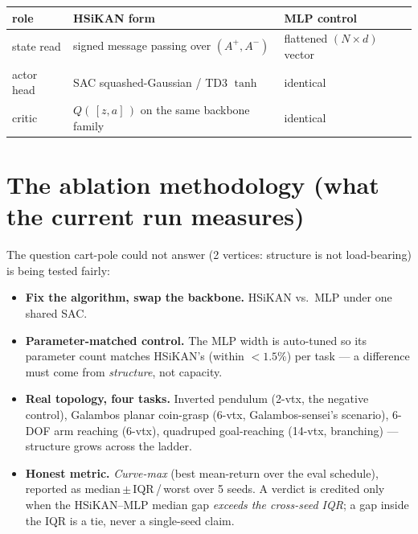 \documentclass[11pt]{article}
\begin{document}
\begin{center}\small
\begin{tabular}{lll}
\toprule
role & HSiKAN form & MLP control \\
\midrule
state read & signed message passing over $(A^+,A^-)$ & flattened $(N{\times}d)$ vector \\
actor head & SAC squashed-Gaussian / TD3 $\tanh$ & identical \\
critic & $Q(\,[z,a]\,)$ on the same backbone family & identical \\
\bottomrule
\end{tabular}
\end{center}

\section{The ablation methodology (what the current run measures)}
The question cart-pole could not answer (2 vertices: structure is not load-bearing) is being tested fairly:
\begin{itemize}[nosep]
  \item \textbf{Fix the algorithm, swap the backbone.} HSiKAN vs.\ MLP under one shared SAC.
  \item \textbf{Parameter-matched control.} The MLP width is auto-tuned so its parameter count matches HSiKAN's
        (within $<1.5\%$) per task --- a difference must come from \emph{structure}, not capacity.
  \item \textbf{Real topology, four tasks.} Inverted pendulum (2-vtx, the negative control), Galambos planar
        coin-grasp (6-vtx, Galambos-sensei's scenario), 6-DOF arm reaching (6-vtx), quadruped goal-reaching
        (14-vtx, branching) --- structure grows across the ladder.
  \item \textbf{Honest metric.} \emph{Curve-max} (best mean-return over the eval schedule), reported as
        median\,$\pm$\,IQR\,/\,worst over 5 seeds. A verdict is credited only when the HSiKAN--MLP median gap
        \emph{exceeds the cross-seed IQR}; a gap inside the IQR is a tie, never a single-seed claim.
\end{itemize}
\end{document}
